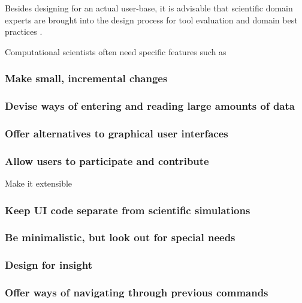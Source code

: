 
Besides designing for an actual user-base, it is advisable that scientific domain experts are brought into the design process for tool evaluation \cite{ Keefe:2010} and domain best practices \cite{Schraefel:2004,  DeMatos:2013}.

Computational scientists often need specific features such as  

\subsubsection{Make small, incremental changes}

\subsubsection{Devise ways of entering and reading large amounts of data}

\subsubsection{Offer alternatives to graphical user interfaces}

\subsubsection{Allow users to participate and contribute} Make it extensible

\subsubsection{Keep UI code separate from scientific simulations}

\subsubsection{Be minimalistic, but look out for special needs}

\subsubsection{Design for insight}

\subsubsection{Offer ways of navigating through previous commands}

